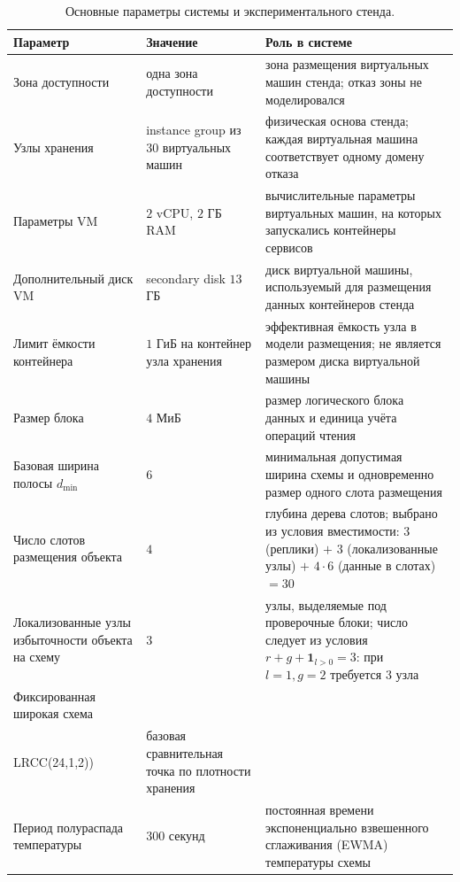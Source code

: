 \begin{center}
\begin{longtable}{|p{}|p{}|p{}|}
\caption{\label{tab:implementation-parameters}
Основные параметры системы и экспериментального стенда.}\\
\hline
Параметр & Значение & Роль в системе \\
\hline
Зона доступности & одна зона доступности & зона размещения виртуальных машин стенда; отказ зоны не моделировался \\
\hline
Узлы хранения & instance group из \(30\) виртуальных машин & физическая основа стенда; каждая виртуальная машина соответствует одному домену отказа \\
\hline
Параметры VM & \(2\) vCPU, \(2\) ГБ RAM & вычислительные параметры виртуальных машин, на которых запускались контейнеры сервисов \\
\hline
Дополнительный диск VM & secondary disk \(13\) ГБ & диск виртуальной машины, используемый для размещения данных контейнеров стенда \\
\hline
Лимит ёмкости контейнера & \(1\) ГиБ на контейнер узла хранения & эффективная ёмкость узла в модели размещения; не является размером диска виртуальной машины \\
\hline
Размер блока & \(4\) МиБ & размер логического блока данных и единица учёта операций чтения \\
\hline
Базовая ширина полосы \(d_{\min}\) & \(6\) & минимальная допустимая ширина схемы и одновременно размер одного слота размещения \\
\hline
Число слотов размещения объекта & \(4\) & глубина дерева слотов; выбрано из условия вместимости: \(3\) (реплики) \(+\) \(3\) (локализованные узлы) \(+\) \(4 \cdot 6\) (данные в слотах) \(= 30\) \\
\hline
Локализованные узлы избыточности объекта на схему & \(3\) & узлы, выделяемые под проверочные блоки; число следует из условия \(r + g + \mathbf{1}_{l>0} = 3\): при \(l=1, g=2\) требуется \(3\) узла \\
\hline
Фиксированная широкая схема & \(\begin{array}{c}Hy(0,\\ LRCC(24,1,2))\end{array}\) & базовая сравнительная точка по плотности хранения \\
\hline
Период полураспада температуры & \(300\) секунд & постоянная времени экспоненциально взвешенного сглаживания (EWMA) температуры схемы \\
\hline
\end{longtable}
\end{center}

